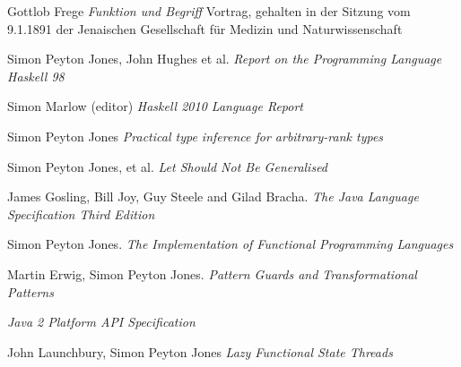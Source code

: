 \documentclass[letterpaper,12pt]{report}
\begin{document}









\appendix


\begin{thebibliography}{99}

 Gottlob Frege \emph{Funktion und Begriff} 
\small{Vortrag, gehalten in der Sitzung vom 9.1.1891 der Jenaischen Gesellschaft für Medizin und Naturwissenschaft}

 Simon Peyton Jones,
John Hughes et al. \emph{Report on the Programming Language
Haskell 98}

 Simon Marlow (editor) \emph{Haskell 2010 Language Report}

 Simon Peyton Jones \emph{Practical type
inference for arbitrary-rank types}

 Simon Peyton Jones, et al. \emph{Let Should Not Be Generalised}

 James Gosling, Bill Joy, Guy Steele and
Gilad Bracha. \emph{The Java Language Specification Third
Edition}

 Simon Peyton Jones. \emph{The Implementation of
Functional Programming Languages}

 Martin Erwig, Simon Peyton Jones. \emph{Pattern
Guards and Transformational Patterns}

 \emph{Java 2 Platform API Specification}

 John Launchbury, Simon Peyton Jones \emph{Lazy Functional State Threads}

\end{thebibliography}


\printindex

\end{document}
